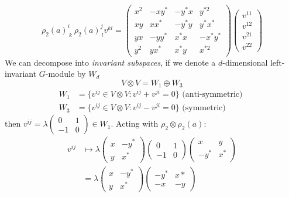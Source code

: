 \begin{enumerate}
\begin{equation}
    \rho_2(a)^i_{\ k}\ \rho_2(a)^j_{\ l}v^{kl}=\begin{pmatrix}
         x^2 & -xy^*& -y^*x& y^{*2}\\             xy & xx^*& -y^*y& y^*x^*\\
         yx & -yy^*& x^*x& -x^*y^*\\
         y^2 & yx^*& x^*y& x^{*2}
    \end{pmatrix}\begin{pmatrix}
        v^{11}\\
        v^{12}\\
        v^{21}\\
        v^{22}
    \end{pmatrix}
\end{equation}
We can decompose into \textit{invariant subspaces}, if we denote a $d$-dimensional left-invariant $G$-module by $W_d$
\begin{equation}
    V\otimes V = W_1\oplus W_3
\end{equation}
\begin{equation}
    \begin{split}
        W_1 &= \{v^{ij}\in V\otimes V: v^{ij} + v^{ji} =0\} \text{ (anti-symmetric) }\\
        W_3&=\{v^{ij}\in V\otimes V: v^{ij} - v^{ji} =0\} \text{ (symmetric) }
    \end{split}
\end{equation}
then $v^{ij} = \lambda \begin{pmatrix} 0&1\\ -1&0\end{pmatrix}\in W_1$. Acting with $\rho_2\otimes\rho_2(a)$: 
\begin{equation}
    \begin{split}
        v^{ij}&\mapsto \lambda\begin{pmatrix} x&-y^*\\ y&x^*\end{pmatrix}\begin{pmatrix} 0&1\\ -1&0\end{pmatrix}\begin{pmatrix} x&y\\ -y^*&x^*\end{pmatrix}\\
        &=\lambda\begin{pmatrix} x&-y^*\\ y&x^*\end{pmatrix}\begin{pmatrix} -y^*&x*\\ -x&-y\end{pmatrix}\\

\end{split}
\end{equation}
\end{enumerate}
